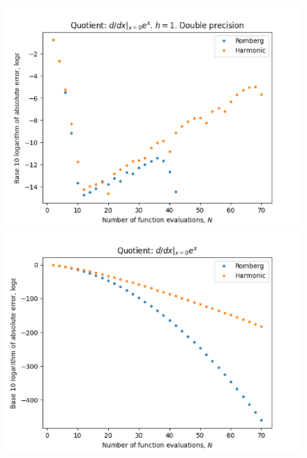 \begin{figure}[H]
\centering
\begin{minipage}{0.45\textwidth}
\centering
\includegraphics[scale=0.45]{../results/diff_quot_plots/exp_0.png}
\end{minipage}
\begin{minipage}{0.45\textwidth}
\centering
\includegraphics[scale=0.45]{../results/diff_quot_plots/exp_0_hp.png}
\end{minipage}
\end{figure}

